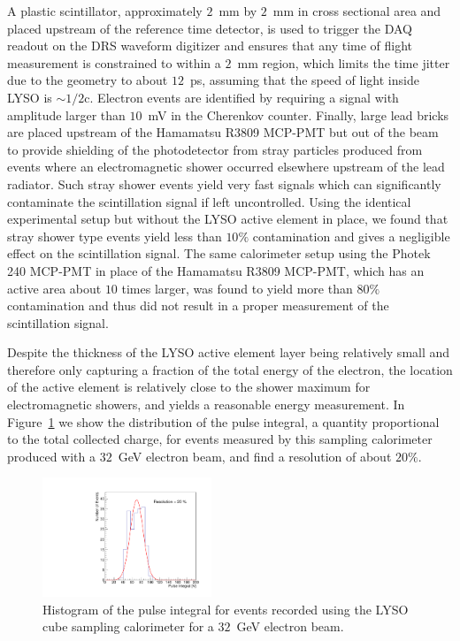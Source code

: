 \documentclass[12pt]{article}
\begin{document}
A plastic scintillator, approximately $2$~mm by $2$~mm in cross sectional area
and placed upstream of the reference time detector, is used to trigger
the DAQ readout on the DRS waveform digitizer and ensures that any
time of flight measurement is constrained to within a $2$~mm region,
which limits the time jitter due to the geometry to about $12$~ps, assuming that
the speed of light inside LYSO is $\sim 1/2$c. 
Electron events are identified by requiring a signal with amplitude
larger than $10$~mV in the Cherenkov counter.
Finally, large lead bricks are placed upstream of the Hamamatsu
R3809 MCP-PMT but out of the beam to provide shielding of the photodetector
from stray particles produced from events where an electromagnetic shower
occurred elsewhere upstream of the lead radiator. Such stray shower
events yield very fast signals which can significantly contaminate the
scintillation signal if left uncontrolled. Using the identical
experimental setup but without the LYSO active element in place,
we found that stray shower type events yield less than $10\%$ contamination
and gives a negligible effect on the scintillation signal. The same calorimeter
setup using the Photek 240 MCP-PMT in place of the Hamamatsu R3809 MCP-PMT,
which has an active area about $10$ times larger, was found to yield 
more than $80\%$ contamination and thus did not result in a proper
measurement of the scintillation signal.

Despite the thickness of the LYSO active element layer being relatively
small and therefore only capturing a fraction of the total energy
of the electron, the location of the active element is relatively close to the
shower maximum for electromagnetic showers, and yields
a reasonable energy measurement. In Figure~\ref{fig:LYSOCubeEnergy32GeV}
we show the distribution of the pulse integral, a quantity
proportional to the total collected charge, for events
measured by this sampling calorimeter produced with a
$32$~GeV electron beam, and find a resolution of about $20\%$.


\begin{figure}[h] \centering
\includegraphics[width=0.45\textwidth]{figs/TOF_Electron_LYSOCube_32GeV_energy} 
\caption{ Histogram of the pulse integral for events recorded using
the LYSO cube sampling calorimeter for a $32$~GeV electron beam. } 
\label{fig:LYSOCubeEnergy32GeV}
\end{figure}
\end{document}
